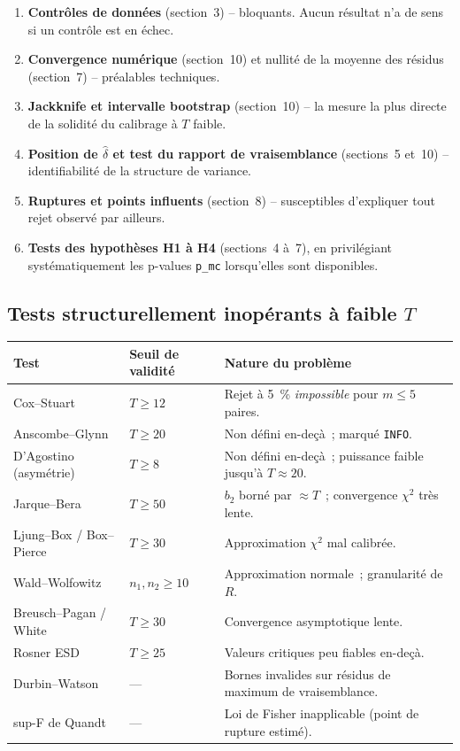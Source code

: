\documentclass[a4paper,11pt]{article}
\newcommand{\code}[1]{\texttt{\small #1}}
\begin{document}
\begin{enumerate}[itemsep=2pt]
  \item \textbf{Contrôles de données} (section~3) -- bloquants. Aucun résultat n'a de sens si un
        contrôle est en échec.
  \item \textbf{Convergence numérique} (section~10) et nullité de la moyenne des résidus
        (section~7) -- préalables techniques.
  \item \textbf{Jackknife et intervalle bootstrap} (section~10) -- la mesure la plus directe de la
        solidité du calibrage à $T$ faible.
  \item \textbf{Position de $\hat\delta$ et test du rapport de vraisemblance} (sections~5 et~10)
        -- identifiabilité de la structure de variance.
  \item \textbf{Ruptures et points influents} (section~8) -- susceptibles d'expliquer tout rejet
        observé par ailleurs.
  \item \textbf{Tests des hypothèses H1 à H4} (sections~4 à~7), en privilégiant systématiquement
        les p-values \code{p\_mc} lorsqu'elles sont disponibles.
\end{enumerate}

\subsection*{Tests structurellement inopérants à faible $T$}

\begin{center}
\small
\begin{tabular}{@{}p{4.4cm}p{2.6cm}p{8.0cm}@{}}
\toprule
\textbf{Test} & \textbf{Seuil de validité} & \textbf{Nature du problème} \\
\midrule
Cox--Stuart & $T \ge 12$ & Rejet à 5~\% \emph{impossible} pour $m \le 5$ paires. \\
Anscombe--Glynn & $T \ge 20$ & Non défini en-deçà~; marqué \code{INFO}. \\
D'Agostino (asymétrie) & $T \ge 8$ & Non défini en-deçà~; puissance faible jusqu'à $T \approx 20$. \\
Jarque--Bera & $T \ge 50$ & $b_2$ borné par $\approx T$~; convergence $\chi^2$ très lente. \\
Ljung--Box / Box--Pierce & $T \ge 30$ & Approximation $\chi^2$ mal calibrée. \\
Wald--Wolfowitz & $n_1,n_2 \ge 10$ & Approximation normale~; granularité de $R$. \\
Breusch--Pagan / White & $T \ge 30$ & Convergence asymptotique lente. \\
Rosner ESD & $T \ge 25$ & Valeurs critiques peu fiables en-deçà. \\
Durbin--Watson & --- & Bornes invalides sur résidus de maximum de vraisemblance. \\
sup-F de Quandt & --- & Loi de Fisher inapplicable (point de rupture estimé). \\
\bottomrule
\end{tabular}
\end{center}
\end{document}
